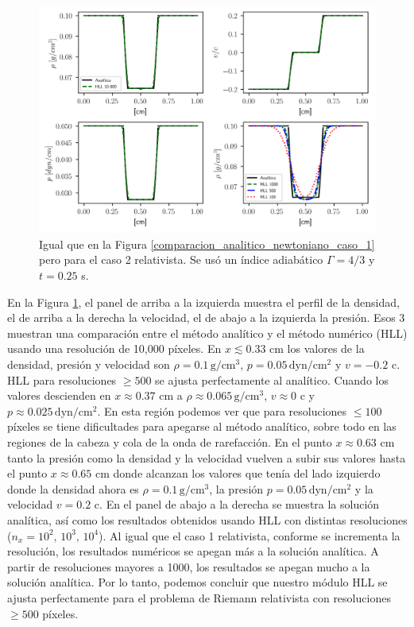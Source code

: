 \documentclass[12pt,a4paper]{book}
\begin{document}
\begin{figure}
  \centering
    \includegraphics[width=1.0\textwidth]{./Figuras/verificacion_del_codigo/caso_relativista/caso_rel_rar_rar.png}
  \caption{Igual que en la Figura \ref{comparacion_analitico_newtoniano_caso_1} pero para el caso 2 
  relativista. Se usó un índice adiabático $\Gamma = 4/3$ y $t = 0.25$ s.
  } \label{caso_rel_shock_shock_2}
\end{figure}

En la Figura \ref{caso_rel_shock_shock_2}, el panel de arriba a la izquierda muestra el perfil de la 
densidad, el de arriba a la derecha la velocidad, el de abajo a la izquierda la presión. Esos 3 muestran
una comparación entre el método analítico y el método numérico (HLL) usando una resolución de 
10,000 píxeles. 
En $x \lesssim 0.33$ cm los valores de la densidad, presión y velocidad son 
$\rho = 0.1 \,  \text{g}/ \text{cm}^3$, $p = 0.05 \,  \text{dyn}/ \text{cm}^2 $
y $v = -0.2$ c. HLL para resoluciones $\geq 500$ se ajusta perfectamente al analítico. Cuando los 
valores descienden en $x \approx 0.37$ cm a $\rho \approx 0.065 \,  \text{g}/ \text{cm}^3$, 
$v \approx 0$ c y $p \approx 0.025\,  \text{dyn}/ \text{cm}^2 $. En
esta región podemos ver que para resoluciones $\leq 100$ píxeles se tiene dificultades para apegarse al
método analítico, sobre todo en las regiones de la cabeza y cola de la onda de rarefacción. En el punto $x \approx 0.63$  cm tanto la presión como la densidad y la velocidad vuelven a subir
sus valores hasta el punto $x \approx 0.65$ cm donde alcanzan los valores que tenía del lado izquierdo
donde la densidad ahora es $\rho = 0.1 \,  \text{g}/ \text{cm}^3$, la presión $p = 0.05 \,  \text{dyn}/ \text{cm}^2 $ 
y la velocidad $v = 0.2$ c.
En el panel de abajo a la derecha se muestra la solución analítica, así como los resultados obtenidos 
usando HLL con distintas resoluciones ($n_x = 10^2, \, 10^3, \,10^4$). 
Al igual que el caso 1 relativista,
conforme se incrementa la resolución, los resultados numéricos se apegan más a la solución analítica.
A partir de resoluciones mayores a 1000, los resultados se apegan mucho a la solución analítica.
Por lo tanto, podemos concluir que nuestro módulo HLL se ajusta perfectamente para el problema de 
Riemann relativista con resoluciones $\geq 500$ píxeles.
\end{document}
